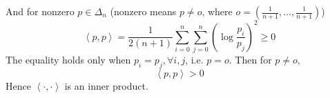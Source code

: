 \documentclass{amsart}
\theoremstyle{plain}
\theoremstyle{definition}
\theoremstyle{remark}
\begin{document}
And for nonzero $p\in\Delta _n$ (nonzero means $p\neq o$, where $o=\left( \frac{1}{n+1},\dots,\frac{1}{n+1} \right)$)
\[
\left< p,p \right> =\frac{1}{2(n+1)}\sum_{i=0}^{n} \sum_{j=0}^{n} \left( \log\frac{p_i}{p_j} \right)^{2}\geq 0
\]
The equality holds only when $p_i=p_j,\forall i,j$, i.e. $p=o$. Then for $p\neq o$,
\[
\left< p,p \right> >0
\]
Hence $\left< \cdot,\cdot  \right>$ is an inner product.
\end{document}
